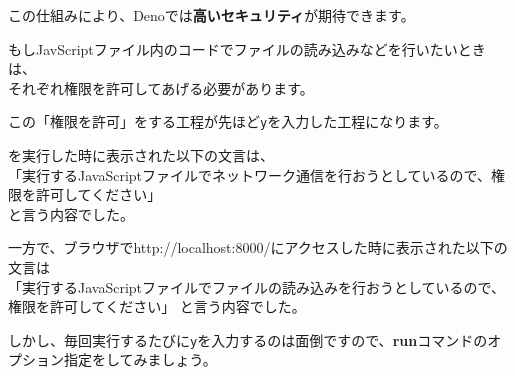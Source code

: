 この仕組みにより、Denoでは\textbf{高いセキュリティ}が期待できます。

もしJavScriptファイル内のコードでファイルの読み込みなどを行いたいときは、\\
それぞれ権限を許可してあげる必要があります。

この「権限を許可」をする工程が先ほど\texttt{y}を入力した工程になります。

\begin{Shaded}
\begin{Highlighting}[]
\end{Highlighting}
\end{Shaded}

を実行した時に表示された以下の文言は、\\
「実行するJavaScriptファイルでネットワーク通信を行おうとしているので、権限を許可してください」\\
と言う内容でした。

\begin{Shaded}
\begin{Highlighting}[]
\end{Highlighting}
\end{Shaded}

一方で、ブラウザでhttp://localhost:8000/にアクセスした時に表示された以下の文言は\\
「実行するJavaScriptファイルでファイルの読み込みを行おうとしているので、権限を許可してください」
と言う内容でした。

\begin{Shaded}
\begin{Highlighting}[]
\end{Highlighting}
\end{Shaded}

しかし、毎回実行するたびに\texttt{y}を入力するのは面倒ですので、\textbf{run}コマンドのオプション指定をしてみましょう。

